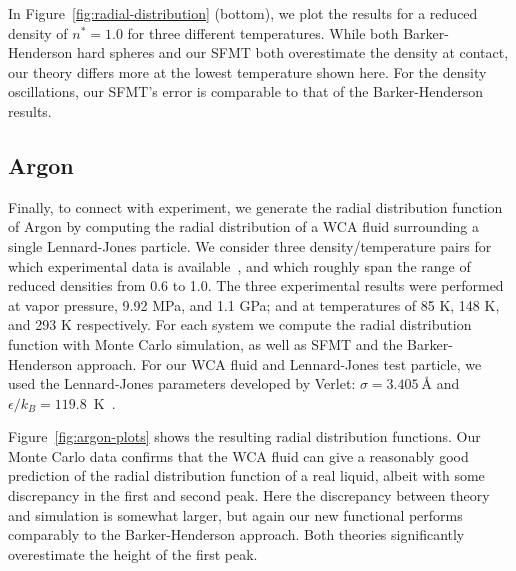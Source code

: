 \documentclass[letterpaper,twocolumn,amsmath,amssymb,prb]{revtex4-1}
\begin{document}
In Figure~\ref{fig:radial-distribution} (bottom), we plot the results
for a reduced density of $n^*=1.0$ for three different
temperatures. While both Barker-Henderson hard spheres and our SFMT
both overestimate the density at contact, our theory differs more at
the lowest temperature shown here. For the density oscillations, our
SFMT's error is comparable to that of the Barker-Henderson results.



\subsection{Argon}

Finally, to connect with experiment, we generate the radial
distribution function of Argon by computing the radial distribution of
a WCA fluid surrounding a single Lennard-Jones particle.  We consider
three density/temperature pairs for which experimental data is
available~\cite{mikolaj2004structure, eggert2002quantitative,
yarnell1973structure}, and which roughly span the range of reduced
densities from 0.6 to 1.0. The three experimental results were
performed at vapor pressure, 9.92 MPa, and 1.1 GPa; and at
temperatures of 85 K, 148 K, and 293 K respectively. For each system we
compute the radial distribution function with Monte Carlo simulation,
as well as SFMT and the Barker-Henderson approach.  For our WCA fluid
and Lennard-Jones test particle, we used the Lennard-Jones parameters
developed by Verlet: $\sigma = 3.405 ~\textrm{\AA}$ and $\epsilon/k_B =
119.8$~K~\cite{verlet1967computer}.

Figure~\ref{fig:argon-plots} shows the resulting radial distribution
functions.  Our Monte Carlo data confirms that the WCA fluid can give
a reasonably good prediction of the radial distribution function of a
real liquid, albeit with some discrepancy in the first and second
peak.  Here the discrepancy between theory and simulation is somewhat
larger, but again our new functional performs comparably to the
Barker-Henderson approach.  Both theories significantly overestimate
the height of the first peak.
\end{document}
